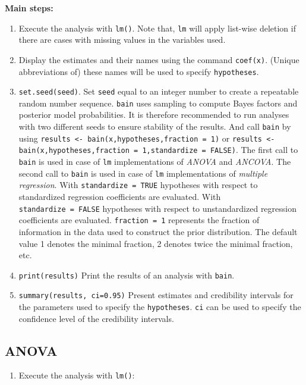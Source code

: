 \documentclass[
]{book}
\providecommand{\tightlist}{%
  \setlength{\itemsep}{0pt}\setlength{\parskip}{0pt}}
\begin{document}
\textbf{Main steps:}

\begin{enumerate}
\def\labelenumi{\arabic{enumi})}
\item
  Execute the analysis with \texttt{lm()}. Note that, \texttt{lm} will apply list-wise deletion if there are cases with missing values in the variables used.
\item
  Display the estimates and their names using the command \texttt{coef(x)}. (Unique abbreviations of) these names will be used to specify \texttt{hypotheses}.
\item
  \texttt{set.seed(seed)}. Set \texttt{seed} equal to an integer
  number to create a repeatable random number sequence. \texttt{bain} uses sampling to compute Bayes factors and posterior model probabilities. It is therefore recommended to run analyses with two different seeds to ensure stability of the results.
  And call \texttt{bain} by using \texttt{results\ \textless{}-\ bain(x,hypotheses,fraction\ =\ 1)} or
  \texttt{results\ \textless{}-bain(x,hypotheses,fraction\ =\ 1,standardize\ =\ FALSE)}. The first call to
  \texttt{bain} is used in case of \texttt{lm} implementations of \emph{ANOVA} and \emph{ANCOVA}. The
  second call to \texttt{bain} is used in case of \texttt{lm} implementations of
  \emph{multiple regression}. With \texttt{standardize\ =\ TRUE} hypotheses with respect
  to standardized regression coefficients are evaluated. With \texttt{standardize\ =\ FALSE} hypotheses with respect to unstandardized regression coefficients
  are evaluated. \texttt{fraction\ =\ 1} represents the fraction of information in the data used to construct the prior distribution. The default value 1 denotes the minimal fraction, 2 denotes twice the minimal fraction, etc.
\item
  \texttt{print(results)} Print the results of an analysis with
  \texttt{bain}.
\item
  \texttt{summary(results,\ ci=0.95)} Present estimates and credibility intervals for the parameters used to specify the \texttt{hypotheses}. \texttt{ci} can be used to specify the confidence level of the credibility intervals.
\end{enumerate}

\hypertarget{anova}{%
\subsection{ANOVA}\label{anova}}

\begin{enumerate}
\def\labelenumi{\arabic{enumi})}
\tightlist
\item
  Execute the analysis with \texttt{lm()}:
\end{enumerate}
\end{document}
